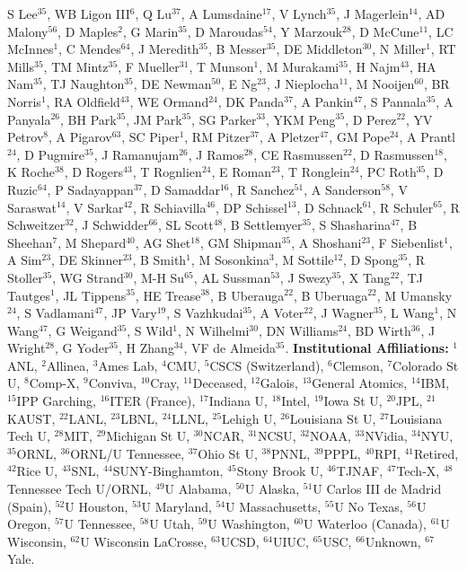 S Lee$^{35}$,
WB Ligon III$^{6}$,
Q Lu$^{37}$,
A Lumsdaine$^{17}$,
V Lynch$^{35}$,
J Magerlein$^{14}$,
AD Malony$^{56}$,
D Maples$^{2}$,
G Marin$^{35}$,
D Maroudas$^{54}$,
Y Marzouk$^{28}$,
D McCune$^{11}$,
LC McInnes$^{1}$,
C Mendes$^{64}$,
J Meredith$^{35}$,
B Messer$^{35}$,
DE Middleton$^{30}$,
N Miller$^{1}$,
RT Mills$^{35}$,
TM Mintz$^{35}$,
F Mueller$^{31}$,
T Munson$^{1}$,
M Murakami$^{35}$,
H Najm$^{43}$,
HA Nam$^{35}$,
TJ Naughton$^{35}$,
DE Newman$^{50}$,
E Ng$^{23}$,
J Nieplocha$^{11}$,
M Nooijen$^{60}$,
BR Norris$^{1}$,
RA Oldfield$^{43}$,
WE Ormand$^{24}$,
DK Panda$^{37}$,
A Pankin$^{47}$,
S Pannala$^{35}$,
A Panyala$^{26}$,
BH Park$^{35}$,
JM Park$^{35}$,
SG Parker$^{33}$,
YKM Peng$^{35}$,
D Perez$^{22}$,
YV Petrov$^{8}$,
A Pigarov$^{63}$,
SC Piper$^{1}$,
RM Pitzer$^{37}$,
A Pletzer$^{47}$,
GM Pope$^{24}$,
A Prantl$^{24}$,
D Pugmire$^{35}$,
J Ramanujam$^{26}$,
J Ramos$^{28}$,
CE Rasmussen$^{22}$,
D Rasmussen$^{18}$,
K Roche$^{38}$,
D Rogers$^{43}$,
T Rognlien$^{24}$,
E Roman$^{23}$,
T Ronglein$^{24}$,
PC Roth$^{35}$,
D Ruzic$^{64}$,
P Sadayappan$^{37}$,
D Samaddar$^{16}$,
R Sanchez$^{51}$,
A Sanderson$^{58}$,
V Saraswat$^{14}$,
V Sarkar$^{42}$,
R Schiavilla$^{46}$,
DP Schissel$^{13}$,
D Schnack$^{61}$,
R Schuler$^{65}$,
R Schweitzer$^{32}$,
J Schwidder$^{66}$,
SL Scott$^{48}$,
B Settlemyer$^{35}$,
S Shasharina$^{47}$,
B Sheehan$^{7}$,
M Shepard$^{40}$,
AG Shet$^{18}$,
GM Shipman$^{35}$,
A Shoshani$^{23}$,
F Siebenlist$^{1}$,
A Sim$^{23}$,
DE Skinner$^{23}$,
B Smith$^{1}$,
M Sosonkina$^{3}$,
M Sottile$^{12}$,
D Spong$^{35}$,
R Stoller$^{35}$,
WG Strand$^{30}$,
M-H Su$^{65}$,
AL Sussman$^{53}$,
J Swezy$^{35}$,
X Tang$^{22}$,
TJ Tautges$^{1}$,
JL Tippens$^{35}$,
HE Trease$^{38}$,
B Uberauga$^{22}$,
B Uberuaga$^{22}$,
M Umansky$^{24}$,
S Vadlamani$^{47}$,
JP Vary$^{19}$,
S Vazhkudai$^{35}$,
A Voter$^{22}$,
J Wagner$^{35}$,
L Wang$^{1}$,
N Wang$^{47}$,
G Weigand$^{35}$,
S Wild$^{1}$,
N Wilhelmi$^{30}$,
DN Williams$^{24}$,
BD Wirth$^{36}$,
J Wright$^{28}$,
G Yoder$^{35}$,
H Zhang$^{34}$,
VF de Almeida$^{35}$.
\noindent
{\bf Institutional Affiliations:}
$^{1}$ANL,
$^{2}$Allinea,
$^{3}$Ames Lab,
$^{4}$CMU,
$^{5}$CSCS (Switzerland),
$^{6}$Clemson,
$^{7}$Colorado St U,
$^{8}$Comp-X,
$^{9}$Conviva,
$^{10}$Cray,
$^{11}$Deceased,
$^{12}$Galois,
$^{13}$General Atomics,
$^{14}$IBM,
$^{15}$IPP Garching,
$^{16}$ITER (France),
$^{17}$Indiana U,
$^{18}$Intel,
$^{19}$Iowa St U,
$^{20}$JPL,
$^{21}$KAUST,
$^{22}$LANL,
$^{23}$LBNL,
$^{24}$LLNL,
$^{25}$Lehigh U,
$^{26}$Louisiana St U,
$^{27}$Louisiana Tech U,
$^{28}$MIT,
$^{29}$Michigan St U,
$^{30}$NCAR,
$^{31}$NCSU,
$^{32}$NOAA,
$^{33}$NVidia,
$^{34}$NYU,
$^{35}$ORNL,
$^{36}$ORNL/U Tennessee,
$^{37}$Ohio St U,
$^{38}$PNNL,
$^{39}$PPPL,
$^{40}$RPI,
$^{41}$Retired,
$^{42}$Rice U,
$^{43}$SNL,
$^{44}$SUNY-Binghamton,
$^{45}$Stony Brook U,
$^{46}$TJNAF,
$^{47}$Tech-X,
$^{48}$Tennessee Tech U/ORNL,
$^{49}$U Alabama,
$^{50}$U Alaska,
$^{51}$U Carlos III de Madrid (Spain),
$^{52}$U Houston,
$^{53}$U Maryland,
$^{54}$U Massachusetts,
$^{55}$U No Texas,
$^{56}$U Oregon,
$^{57}$U Tennessee,
$^{58}$U Utah,
$^{59}$U Washington,
$^{60}$U Waterloo (Canada),
$^{61}$U Wisconsin,
$^{62}$U Wisconsin LaCrosse,
$^{63}$UCSD,
$^{64}$UIUC,
$^{65}$USC,
$^{66}$Unknown,
$^{67}$Yale.

